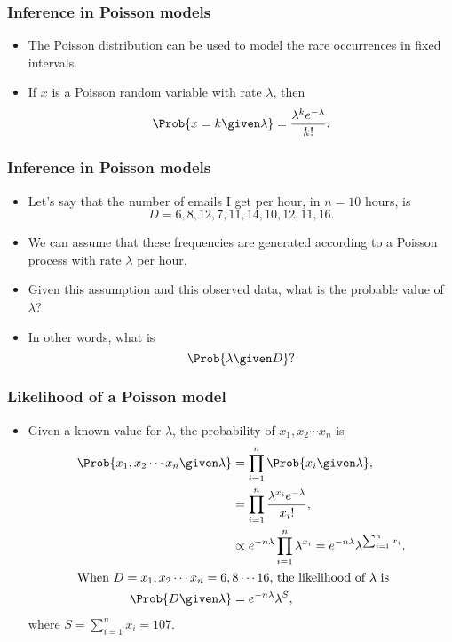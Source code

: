 \documentclass{slides}
\begin{document}
	\begin{frame}
		\frametitle{Inference in Poisson models}
		\begin{itemize}
			\item The Poisson distribution can be used to model the rare occurrences in fixed intervals.
			\item If $x$ is a Poisson random variable with rate $\lambda$, then 
				\[\Prob{x = k \given \lambda} = \frac{\lambda^k e^{-\lambda}}{k!}.\]
		\end{itemize}
		
	\end{frame}
	
	\begin{frame}
		\frametitle{Inference in Poisson models}
		\begin{itemize}
			\item Let's say that the number of emails I get per hour, in $n=10$ hours, is 
				\[D = 6, 8, 12,  7, 11, 14, 10, 12, 11, 16.\]
			\item We can assume that these frequencies are generated according to a Poisson process with rate $\lambda$ per hour.
			\item Given this assumption and this observed data, what is the probable value of $\lambda$?
			\item In other words, what is 
				\[
					\Prob{\lambda \given D}?
				\]
		\end{itemize}
	\end{frame}

	\begin{frame}
		\frametitle{Likelihood of a Poisson model}
		\begin{itemize}
			\item Given a known value for $\lambda$, the probability of $x_1, x_2 \cdots x_n$ is 
				\begin{align*}
					\Prob{x_1, x_2 \cdots x_n \given \lambda} &= \prod_{i=1}^n \Prob{x_i \given \lambda},\\
					&= \prod_{i=1}^n \frac{\lambda^{x_i}e^{-\lambda}}{x_i!},\\
					&\propto e^{-n\lambda}\prod_{i=1}^n \lambda^{x_i} = e^{-n\lambda} \lambda^{\sum_{i=1}^{n}x_i}.\\
					\intertext{When $D = x_1, x_2 \cdots x_n = 6, 8 \cdots 16$, the likelihood of $\lambda$ is}
					\Prob{D \given \lambda} &= e^{-n\lambda} \lambda^{S},
				\end{align*}
				where $S = \sum_{i=1}^{n} x_i = 107$.
		\end{itemize}
	\end{frame}
\end{document}
